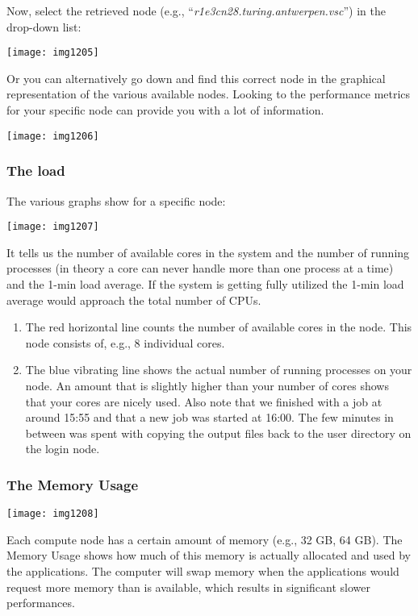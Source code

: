 Now, select the retrieved node (e.g., ``\emph{r1e3cn28.turing.antwerpen.vsc}'')
in the drop-down list:

\texttt{[image: img1205]}

Or you can alternatively go down and find this correct node in the graphical
representation of the various available nodes.  Looking to the performance
metrics for your specific node can provide you with a lot of information.

\texttt{[image: img1206]}

\subsubsection{The load}

The various graphs show for a specific node:

\texttt{[image: img1207]}

It tells us the number of available cores in the system and the number of
running processes (in theory a core can never handle more than one process at a
time) and the 1-min load average. If the system is getting fully utilized the
1-min load average would approach the total number of CPUs.

\begin{enumerate}
\item The red horizontal line counts the number of available cores in the node. This node consists of, e.g., 8 individual cores.
\item  The blue vibrating line shows the actual number of running processes on
  your node. An amount that is slightly higher than your number of cores shows
  that your cores are nicely used. Also note that we finished with a job at
  around 15:55 and that a new job was started at 16:00. The few minutes in
  between was spent with copying the output files back to the user directory on
  the login node.
\end{enumerate}

\subsubsection{The Memory Usage}

\texttt{[image: img1208]}

Each compute node has a certain amount of memory (e.g., 32 GB, 64 GB).  The
Memory Usage shows how much of this memory is actually allocated and used by
the applications.  The computer will swap memory when the applications would
request more memory than is available, which results in significant slower
performances.

